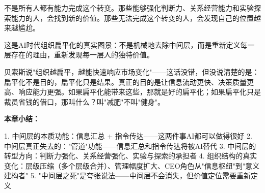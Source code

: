 不是所有人都有能力完成这个转变。那些能够强化判断力、关系经营能力和实验探索能力的人，会找到新的价值。那些无法完成这个转变的人，会发现自己的位置越来越尴尬。

这是AI时代组织扁平化的真实图景：不是机械地去除中间层，而是重新定义每一层存在的理由，重新发现每一层人的独特价值。

贝索斯说"组织越扁平，越能快速响应市场变化"——这话没错，但没说清楚的是：扁平化不是目的，扁平化只是结果。真正的目的是让信息流动更快、决策质量更高、响应能力更强。如果扁平化能带来这些，那就是好的扁平化；如果扁平化只是裁员省钱的借口，那叫什么？叫"减肥"不叫"健身"。


\textbf{本章小结：}

1. 中间层的本质功能：信息汇总 + 指令传达——这两件事AI都可以做得很好
2. 中间层真正失去的："管道"功能——信息汇总和指令传达将被AI替代
3. 中间层的转型方向：判断力强化、关系经营强化、实验与探索的承担者
4. 组织结构的真实变化：层级压缩（多个层级合并）、管理幅度扩大、CEO角色从"信息枢纽"到"意义建构者"
5. "中间层之死"是夸张说法——中间层不会消失，但价值定位需要重新定义

